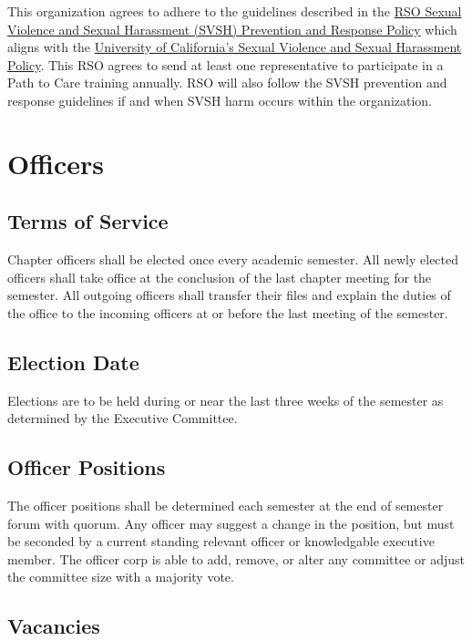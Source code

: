 \documentclass[11pt]{article}
\begin{document}
This organization agrees to adhere to the guidelines described in the \href{https://docs.google.com/document/d/1ex7Won3HvV1lCDYtMSUIkHWaRrl-u0Biu8dMjPdKtIs/edit}{RSO Sexual Violence and Sexual Harassment (SVSH) Prevention and Response Policy} which aligns with the \href{https://policy.ucop.edu/doc/4000385/SVSH}{University of California’s Sexual Violence and Sexual Harassment Policy}.
This RSO agrees to send at least one representative to participate in a Path to Care training annually.
RSO will also follow the SVSH prevention and response guidelines if and when SVSH harm occurs within the organization.
\section{Officers}
\label{sec:orgd6999df}

\subsection{Terms of Service}
\label{sec:orgd8ab27f}

Chapter officers shall be elected once every academic semester.
All newly elected officers shall take office at the conclusion of the last chapter meeting for the semester.
All outgoing officers shall transfer their files and explain the duties of the office to the incoming officers at or before the last meeting of the semester.

\subsection{Election Date}
\label{sec:org9206857}

Elections are to be held during or near the last three weeks of the semester as determined by the Executive Committee.

\subsection{Officer Positions}
\label{sec:org78ba660}

The officer positions shall be determined each semester at the end of semester forum with quorum.
Any officer may suggest a change in the position, but must be seconded by a current standing relevant officer or knowledgable executive member.
The officer corp is able to add, remove, or alter any committee or adjust the committee size with a majority vote.

\subsection{Vacancies}
\label{sec:org8bf42cd}
\end{document}
